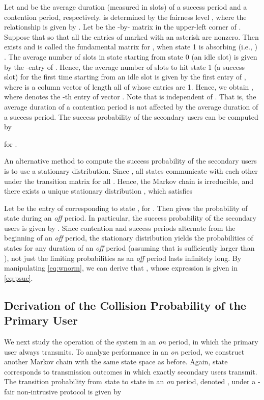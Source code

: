\documentclass[12pt,draftclsnofoot,onecolumn]{IEEEtran}
\begin{document}
Let  and  be the average duration
(measured in slots) of a success period and a contention period, respectively.
 is determined by the fairness level , where the relationship is given by
.
Let  be the -by- matrix in the upper-left
corner of . Suppose that  so that all the
entries of  marked with an asterisk are nonzero.
Then  exists and is called the
fundamental matrix for ,
when state 1 is absorbing (i.e., ) \cite{grinstead}.
The average number of slots in state  starting from state 0 (an idle slot) is given by
the -entry of . Hence,
the average number of slots to hit state 1 (a success slot) for the first time
starting from an idle slot is given by
the first entry of ,
where  is a column vector of length  all of whose entries are 1.
Hence, we obtain ,
where  denotes the -th entry of vector .
Note that  is independent of . That is, the average duration of a contention
period is not affected by the average duration of a success period.
The success probability of the secondary users can be computed by

for .

An alternative method to compute the success probability of the secondary users
is to use a stationary distribution. Since , all states
communicate with each other under the transition matrix 
for all .
Hence, the Markov chain is irreducible, and there exists
a unique stationary distribution ,
which satisfies

Let  be the entry of 
corresponding to state , for .
Then  gives the probability of state  during an \emph{off} period.
In particular, the success probability of the secondary users
is given by .
Since contention and success periods alternate from the beginning
of an \emph{off} period, the stationary distribution yields the probabilities of states
for any duration of an \emph{off} period (assuming that  is sufficiently larger than
), not just the limiting probabilities as an \emph{off} period
lasts infinitely long. By manipulating \eqref{eq:wnorm}, we can derive that
, whose expression is given in \eqref{eq:psuc}.

\subsection{Derivation of the Collision Probability of the Primary User}

We next study the operation of the system in an
\emph{on} period, in which the primary user always transmits.
To analyze performance in an \emph{on} period,
we construct another Markov chain with the same state space 
as before. Again, state  corresponds to transmission outcomes in which exactly  secondary users transmit.
The transition probability from state  to state  in an \emph{on} period, denoted
, under a -fair non-intrusive protocol is given by
\end{document}
